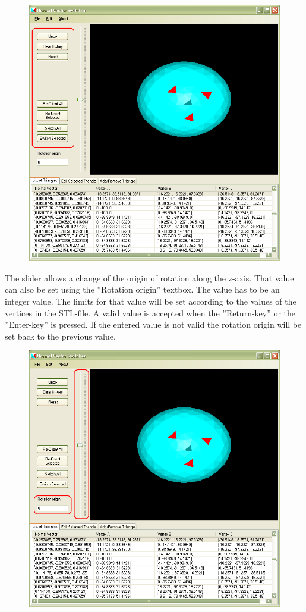 \begin{figure}[hb]
	\centering
	\includegraphics[width=0.9\linewidth]{window2}
\end{figure}

\newpage\noindent
The slider allows a change of the origin of rotation along the z-axis. That value can also be set using the ''Rotation origin'' textbox. The value has to be an integer value. The limits for that value will be set according to the values of the vertices in the STL-file. A valid value is accepted when the ''Return-key'' or the ''Enter-key'' is pressed. If the entered value is not valid the rotation origin will be set back to the previous value.

\begin{figure}[hb]
	\centering
	\includegraphics[width=0.9\linewidth]{window3}
\end{figure}


